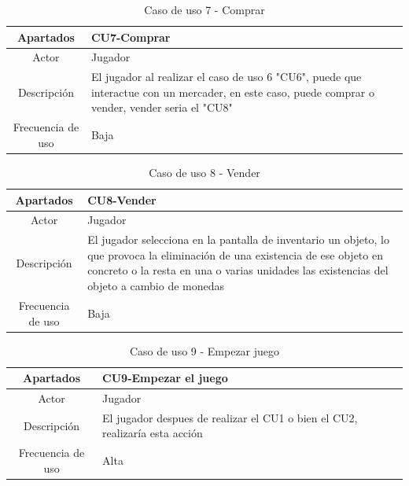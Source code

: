 \documentclass[a4paper]{article}
\begin{document}
\begin{table}[ht]
    \centering
    \begin{tabular}{|c|p{14cm}|} 
        \hline
        \textbf{Apartados}       & \textbf{CU7-Comprar} \\
        \hline
        Actor                    & Jugador \\
        \hline
        Descripción              & El jugador al realizar el caso de uso 6 "CU6", puede que interactue con un mercader, en este caso, puede comprar o vender, vender seria el "CU8" \\
        \hline
        Frecuencia de uso        & Baja \\
        \hline
    \end{tabular}
    \caption{Caso de uso 7 - Comprar}
    \label{tab:casosdeuso-table}
\end{table}

\begin{table}[ht]
    \centering
    \begin{tabular}{|c|p{14cm}|} 
        \hline
        \textbf{Apartados}       & \textbf{CU8-Vender} \\
        \hline
        Actor                    & Jugador \\
        \hline
        Descripción              & El jugador selecciona en la pantalla de inventario un objeto, lo que provoca la eliminación de una existencia de ese objeto en concreto o la resta en una o varias unidades las existencias del objeto a cambio de monedas \\
        \hline
        Frecuencia de uso        & Baja \\
        \hline
    \end{tabular}
    \caption{Caso de uso 8 - Vender}
    \label{tab:casosdeuso-table}
\end{table}

\begin{table}[ht]
    \centering
    \begin{tabular}{|c|p{14cm}|} 
        \hline
        \textbf{Apartados}       & \textbf{CU9-Empezar el juego} \\
        \hline
        Actor                    & Jugador \\
        \hline
        Descripción              & El jugador despues de realizar el CU1 o bien el CU2, realizaría esta acción \\
        \hline
        Frecuencia de uso        & Alta \\
        \hline
    \end{tabular}
    \caption{Caso de uso 9 - Empezar juego}
    \label{tab:casosdeuso-table}
\end{table}
\end{document}
